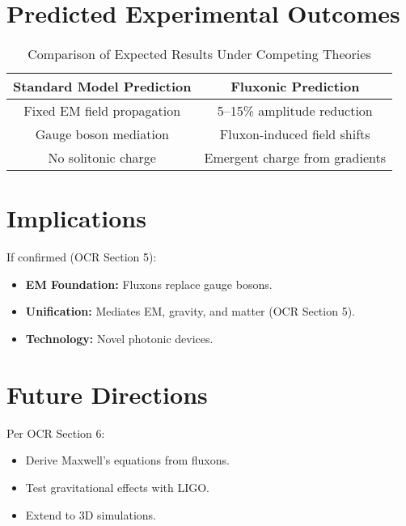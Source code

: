\documentclass{article}
\begin{document}
\section{Predicted Experimental Outcomes}
\begin{table}[h]
    \centering
    \begin{tabular}{|c|c|}
        \hline
        \textbf{Standard Model Prediction} & \textbf{Fluxonic Prediction} \\
        \hline
        Fixed EM field propagation & 5–15\% amplitude reduction \\
        Gauge boson mediation & Fluxon-induced field shifts \\
        No solitonic charge & Emergent charge from gradients \\
        \hline
    \end{tabular}
    \caption{Comparison of Expected Results Under Competing Theories}
    \label{tab:predictions}
\end{table}

\section{Implications}
If confirmed (OCR Section 5):
\begin{itemize}
    \item \textbf{EM Foundation:} Fluxons replace gauge bosons.
    \item \textbf{Unification:} Mediates EM, gravity, and matter (OCR Section 5).
    \item \textbf{Technology:} Novel photonic devices.
\end{itemize}

\section{Future Directions}
Per OCR Section 6:
\begin{itemize}
    \item Derive Maxwell’s equations from fluxons.
    \item Test gravitational effects with LIGO.
    \item Extend to 3D simulations.
\end{itemize}
\end{document}
